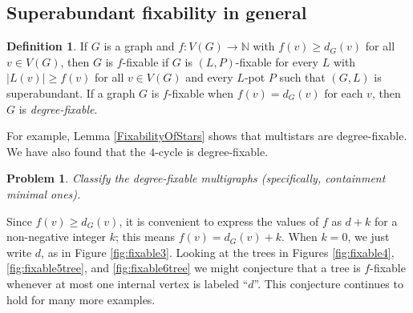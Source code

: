\documentclass[12pt]{article}
\theoremstyle{plain}
\newtheorem{problem}{Problem}
\theoremstyle{definition}
\newtheorem{defn}{Definition}
\theoremstyle{remark}
\newcommand{\IN}{\mathbb{N}}
\newcommand{\func}[3]{#1\colon #2 \rightarrow #3}
\begin{document}
\subsection{Superabundant fixability in general}
	
\begin{defn}
If $G$ is a graph and $\func{f}{V(G)}{\IN}$ with $f(v) \ge d_G(v)$ for all $v
\in V(G)$, then $G$ is $f$-fixable if $G$ is $(L, P)$-fixable for every $L$
with $|L(v)| \ge f(v)$ for all $v \in V(G)$ and every $L$-pot $P$ such that
$(G,L)$ is superabundant.  If a graph $G$ is $f$-fixable when $f(v)=d_G(v)$ for
each $v$, then $G$ is \emph{degree-fixable}.
\end{defn}
	
For example, Lemma \ref{FixabilityOfStars} shows that multistars are
degree-fixable.  We have also found that the $4$-cycle is degree-fixable.
	
\begin{problem}
Classify the degree-fixable multigraphs (specifically, containment minimal
ones).
\end{problem} 
	
Since $f(v) \ge d_G(v)$, it is convenient to express the values of $f$ as $d+k$
for a non-negative integer $k$; this means $f(v) = d_G(v) + k$.  When $k=0$, we
just write $d$, as in Figure \ref{fig:fixable3}.
%
Looking at the trees in Figures \ref{fig:fixable4}, \ref{fig:fixable5tree}, and
\ref{fig:fixable6tree} we might conjecture that a tree is $f$-fixable whenever
at most one internal vertex is labeled ``$d$''.  This conjecture
continues to hold for many more examples.
	
\end{document}
